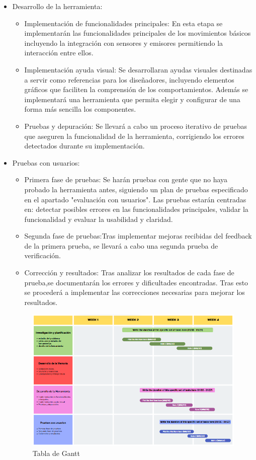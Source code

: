 \begin{itemize}
    \item Desarrollo de la herramienta: 
	\begin{itemize}
	    \item  Implementación de funcionalidades principales: En esta etapa se implementarán las funcionalidades principales de los movimientos básicos incluyendo la integración con sensores y emisores permitiendo la interacción entre ellos.
	    \item Implementación ayuda visual: Se desarrollaran ayudas visuales destinadas a servir como referencias para los diseñadores, incluyendo elementos gráficos que faciliten la comprensión de los comportamientos. Además se implementará una herramienta que permita elegir y configurar de una forma más sencilla los componentes.
	    \item Pruebas y depuración: Se llevará a cabo un proceso iterativo de pruebas que aseguren la funcionalidad de la herramienta, corrigiendo los errores detectados durante su implementación.
	\end{itemize}
    \item Pruebas con usuarios:
	\begin{itemize}
	    \item Primera fase de pruebas: Se harán pruebas con gente que no haya probado la herramienta antes, siguiendo un plan de pruebas especificado en el apartado "evaluación con usuarios". Las pruebas estarán centradas en: detectar posibles errores en las funcionalidades principales, validar la funcionalidad y evaluar la usabilidad y claridad.
	    \item Segunda fase de pruebas:Tras implementar mejoras recibidas del feedback de la primera prueba, se llevará a cabo una segunda prueba de verificación.
	    \item Corrección y resultados: Tras analizar los resultados de cada fase de prueba,se documentarán los errores y dificultades encontradas. Tras esto se procederá a implementar las correcciones necesarias para mejorar los resultados. 
	\end{itemize}
\begin{figure}[h]
	\centering
	\includegraphics[width = 1\textwidth]{Imagenes/TabladeGantt.png}
	\caption{Tabla de Gantt }
	\label{fig:Tabla de Gantt}
\end{figure}
\end{itemize}
